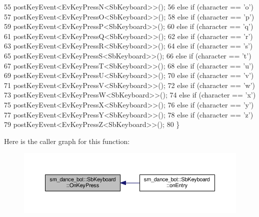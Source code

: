\begin{DoxyCode}
55                         postKeyEvent<EvKeyPressN<SbKeyboard>>();
56                 \textcolor{keywordflow}{else} \textcolor{keywordflow}{if} (character == \textcolor{charliteral}{'o'})
57                         postKeyEvent<EvKeyPressO<SbKeyboard>>();
58                 \textcolor{keywordflow}{else} \textcolor{keywordflow}{if} (character == \textcolor{charliteral}{'p'})
59                         postKeyEvent<EvKeyPressP<SbKeyboard>>();
60                 \textcolor{keywordflow}{else} \textcolor{keywordflow}{if} (character == \textcolor{charliteral}{'q'})
61                         postKeyEvent<EvKeyPressQ<SbKeyboard>>();
62                 \textcolor{keywordflow}{else} \textcolor{keywordflow}{if} (character == \textcolor{charliteral}{'r'})
63                         postKeyEvent<EvKeyPressR<SbKeyboard>>();
64                 \textcolor{keywordflow}{else} \textcolor{keywordflow}{if} (character == \textcolor{charliteral}{'s'})
65                         postKeyEvent<EvKeyPressS<SbKeyboard>>();
66                 \textcolor{keywordflow}{else} \textcolor{keywordflow}{if} (character == \textcolor{charliteral}{'t'})
67                         postKeyEvent<EvKeyPressT<SbKeyboard>>();
68                 \textcolor{keywordflow}{else} \textcolor{keywordflow}{if} (character == \textcolor{charliteral}{'u'})
69                         postKeyEvent<EvKeyPressU<SbKeyboard>>();
70                 \textcolor{keywordflow}{else} \textcolor{keywordflow}{if} (character == \textcolor{charliteral}{'v'})
71                         postKeyEvent<EvKeyPressV<SbKeyboard>>();
72                 \textcolor{keywordflow}{else} \textcolor{keywordflow}{if} (character == \textcolor{charliteral}{'w'})
73                         postKeyEvent<EvKeyPressW<SbKeyboard>>();
74                 \textcolor{keywordflow}{else} \textcolor{keywordflow}{if} (character == \textcolor{charliteral}{'x'})
75                         postKeyEvent<EvKeyPressX<SbKeyboard>>();
76                 \textcolor{keywordflow}{else} \textcolor{keywordflow}{if} (character == \textcolor{charliteral}{'y'})
77                         postKeyEvent<EvKeyPressY<SbKeyboard>>();
78                 \textcolor{keywordflow}{else} \textcolor{keywordflow}{if} (character == \textcolor{charliteral}{'z'})
79                         postKeyEvent<EvKeyPressZ<SbKeyboard>>();
80         \}
\end{DoxyCode}


Here is the caller graph for this function\+:
\nopagebreak
\begin{figure}[H]
\begin{center}
\leavevmode
\includegraphics[width=350pt]{classsm__dance__bot_1_1SbKeyboard_a814aeec77233d8dd1124d4ed0f245f42_icgraph}
\end{center}
\end{figure}


